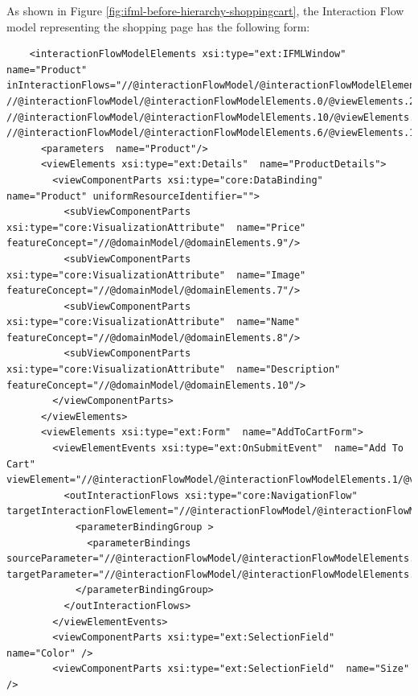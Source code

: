 As shown in Figure \ref{fig:ifml-before-hierarchy-shoppingcart}, the Interaction Flow model representing the shopping page has the following form:
\vspace{0.5cm}
\lstset{language=XML}
\begin{lstlisting} 
    <interactionFlowModelElements xsi:type="ext:IFMLWindow"  name="Product" inInteractionFlows="//@interactionFlowModel/@interactionFlowModelElements.1/@viewElements.2/@viewElementEvents.0/@outInteractionFlows.0 //@interactionFlowModel/@interactionFlowModelElements.0/@viewElements.2/@viewElementEvents.0/@outInteractionFlows.0 //@interactionFlowModel/@interactionFlowModelElements.10/@viewElements.0/@viewElementEvents.0/@outInteractionFlows.0 //@interactionFlowModel/@interactionFlowModelElements.6/@viewElements.1/@viewElements.0/@viewElementEvents.0/@outInteractionFlows.0">
      <parameters  name="Product"/>
      <viewElements xsi:type="ext:Details"  name="ProductDetails">
        <viewComponentParts xsi:type="core:DataBinding"  name="Product" uniformResourceIdentifier="">
          <subViewComponentParts xsi:type="core:VisualizationAttribute"  name="Price" featureConcept="//@domainModel/@domainElements.9"/>
          <subViewComponentParts xsi:type="core:VisualizationAttribute"  name="Image" featureConcept="//@domainModel/@domainElements.7"/>
          <subViewComponentParts xsi:type="core:VisualizationAttribute"  name="Name" featureConcept="//@domainModel/@domainElements.8"/>
          <subViewComponentParts xsi:type="core:VisualizationAttribute"  name="Description" featureConcept="//@domainModel/@domainElements.10"/>
        </viewComponentParts>
      </viewElements>
      <viewElements xsi:type="ext:Form"  name="AddToCartForm">
        <viewElementEvents xsi:type="ext:OnSubmitEvent"  name="Add To Cart" viewElement="//@interactionFlowModel/@interactionFlowModelElements.1/@viewElements.1">
          <outInteractionFlows xsi:type="core:NavigationFlow"  targetInteractionFlowElement="//@interactionFlowModel/@interactionFlowModelElements.9">
            <parameterBindingGroup >
              <parameterBindings  sourceParameter="//@interactionFlowModel/@interactionFlowModelElements.1/@viewElements.1/@viewComponentParts.2" targetParameter="//@interactionFlowModel/@interactionFlowModelElements.1/@viewElements.1/@viewComponentParts.2"/>
            </parameterBindingGroup>
          </outInteractionFlows>
        </viewElementEvents>
        <viewComponentParts xsi:type="ext:SelectionField"  name="Color" />
        <viewComponentParts xsi:type="ext:SelectionField"  name="Size" />

\end{lstlisting}
